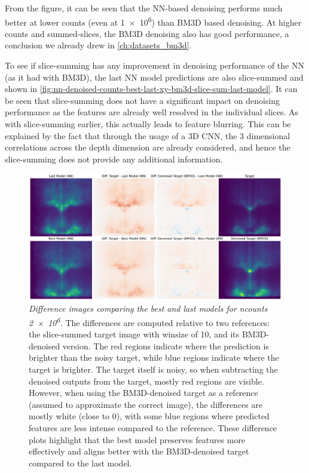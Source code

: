 From the figure, it can be seen that the \gls{NN}-based denoising performs much better at lower counts (even at \num{1e6}) than BM3D based denoising. At higher counts and summed-slices, the BM3D denoising also has good performance, a conclusion we already drew in \cref{ch:datasets_bm3d}. 

To see if slice-summing has any improvement in denoising performance of the \gls{NN} (as it had with BM3D), the last \gls{NN} model predictions are also slice-summed and shown in \cref{fig:nn-denoised-counts-best-last-xy-bm3d-slice-sum-last-model}. It can be seen that slice-summing does not have a significant impact on denoising performance as the features are already well resolved in the individual slices. As with slice-summing earlier, this actually leads to feature blurring. This can be explained by the fact that through the usage of a 3D \gls{CNN}, the \num{3} dimensional correlations across the depth dimension are already considered, and hence the slice-summing does not provide any additional information.

\begin{figure}
    \centering
    \includegraphics[width=1\linewidth]{images/nn_diff_plots_2M.pdf}
    \caption{\textit{Difference images comparing the best and last models for \gls{ncounts} \num{2e6}.} The differences are computed relative to two references: the slice-summed target image with \gls{winsize} of \num{10}, and its BM3D-denoised version. The red regions indicate where the prediction is brighter than the noisy target, while blue regions indicate where the target is brighter. The target itself is noisy, so when subtracting the denoised outputs from the target, mostly red regions are visible. However, when using the BM3D-denoised target as a reference (assumed to approximate the correct image), the differences are mostly white (close to 0), with some blue regions where predicted features are less intense compared to the reference. These difference plots highlight that the best model preserves features more effectively and aligns better with the BM3D-denoised target compared to the last model.}
    \label{fig:nn_diff_plots_2M} 
\end{figure}

